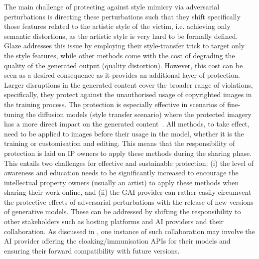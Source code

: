 \documentclass[conference]{IEEEtran}
\newcommand{\reminder}[2][]
{\todo[color=blue!18, #1]{#2}}
\begin{document}
The main challenge of protecting against style mimicry via adversarial perturbations is directing these perturbations such that they shift specifically those features related to the artistic style of the victim, i.e. achieving only semantic distortions, as the artistic style is very hard to be formally defined. 
Glaze addresses this issue by employing their style-transfer trick to target only the style features, while other methods come with the cost of degrading the quality of the generated output (quality distortion).
However, this cost can be seen as a desired consequence as it provides an additional layer of protection. 
Larger disruptions in the generated content cover the broader range of violations, specifically, they protect against the unauthorised usage of copyrighted images in the training process. 
The protection is especially effective in scenarios of fine-tuning the diffusion models (style transfer scenario) where the protected imagery has a more direct impact on the generated content~\cite{liang_mist_2023}.
All methods, to take effect, need to be applied to images before their usage in the model, whether it is the training or customisation and editing. 
This means that the responsibility of protection is laid on IP owners to apply these methods during the sharing phase.
This entails two challenges for effective and sustainable protection: (i) the level of awareness and education needs to be significantly increased to encourage the intellectual property owners (usually an artist) to apply these methods when sharing their work online, and (ii) the GAI provider can rather easily circumvent the protective effects of adversarial perturbations with the release of new versions of generative models. 
These can be addressed by shifting the responsibility to other stakeholders such as hosting platforms and AI providers and their collaboration. 
As discussed in \cite{salman_raising_2023}, one instance of such collaboration may involve the AI provider offering the cloaking/immunisation APIs for their models and ensuring their forward compatibility with future versions.


\end{document}
